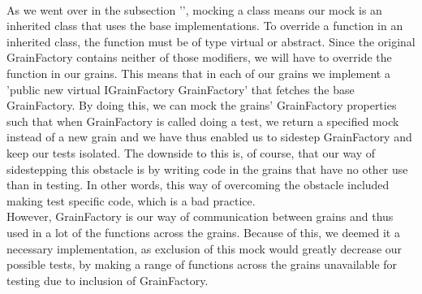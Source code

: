 \\
As we went over in the subsection '', mocking a class means our mock is an inherited class that uses the base implementations. To override a function in an inherited class, the function must be of type virtual or abstract. Since the original GrainFactory contains neither of those modifiers, we will have to override the function in our grains. This means that in each of our grains we implement a 'public new virtual IGrainFactory GrainFactory' that fetches the base GrainFactory. By doing this, we can mock the grains' GrainFactory properties such that when GrainFactory is called doing a test, we return a specified mock instead of a new grain and we have thus enabled us to sidestep GrainFactory and keep our tests isolated. The downside to this is, of course, that our way of sidestepping this obstacle is by writing code in the grains that have no other use than in testing. In other words, this way of overcoming the obstacle included making test specific code, which is a bad practice. \\
However, GrainFactory is our way of communication between grains and thus used in a lot of the functions across the grains. Because of this, we deemed it a necessary implementation, as exclusion of this mock would greatly decrease our possible tests, by making a range of functions across the grains unavailable for testing due to inclusion of GrainFactory.
